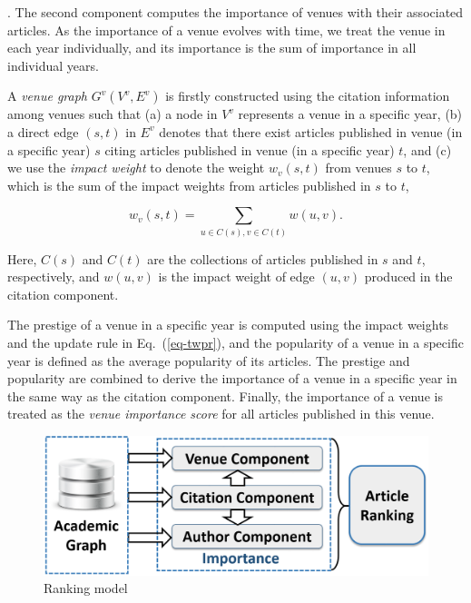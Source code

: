 .
The second component computes the importance of venues with their associated articles. As the importance of a venue  evolves with time, we treat the venue in each year individually, and its importance is the sum of importance in all individual years.


A {\em venue graph} $G^v(V^v, E^v)$ is firstly constructed using the citation information among venues such that (a) a node in $V^v$ represents a venue in a specific year, (b) a direct edge $(s,t)$ in $E^v$ denotes that there exist articles published in venue (in a specific year) $s$ citing articles published in venue (in a specific year) $t$, and (c) we use the {\em impact weight} to denote the weight $w_v(s,t)$ from venues $s$ to $t$, which is the sum of the impact weights from articles published in $s$ to $t$, \ie

\vspace{-2ex}
\begin{small}
\begin{equation} \label{eq-infl-weights-v}
w_v(s,t)  = \sum_{u\in C(s), v\in C(t)} w(u,v).
\end{equation}
\end{small}
\noindent
Here, $C(s)$ and $C(t)$ are the collections of articles published in $s$ and $t$, respectively, and $w(u,v)$ is the impact weight of edge $(u, v)$ produced in the citation component.

The prestige of a venue in a specific year is computed using the impact weights and the update rule in Eq.~(\ref{eq-twpr}), and the popularity of a venue in a specific year is defined as the average popularity of its articles. The prestige and popularity are combined to derive the importance of a venue in a specific year in the same way as the citation component. Finally, the importance of a venue is treated as the {\em venue importance score} for all articles published in this venue.


\begin{figure}[tb!]
\centering
\includegraphics[scale=0.15]{fig/framework-lite-2.eps}
\vspace{-1ex}
\caption{\small Ranking model \ensemblerank} \label{fig-rankmodel}
\vspace{-2ex}
\end{figure}



